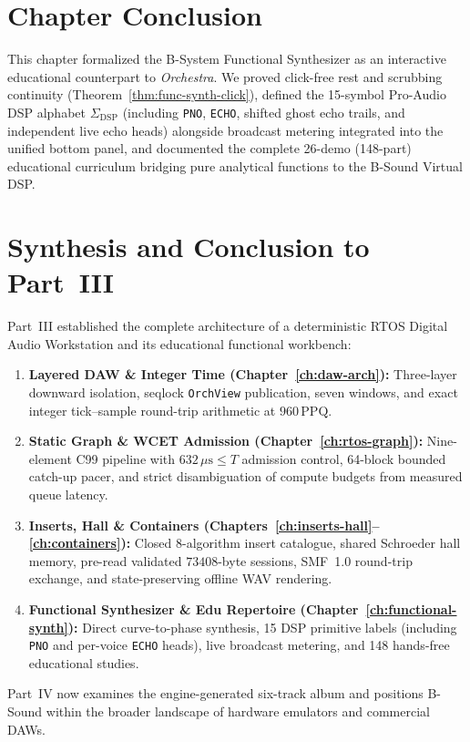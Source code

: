 \section{Chapter Conclusion}

This chapter formalized the B-System Functional Synthesizer as an interactive educational counterpart to \emph{Orchestra}. We proved click-free rest and scrubbing continuity (Theorem~\ref{thm:func-synth-click}), defined the 15-symbol Pro-Audio DSP alphabet $\Sigma_{\mathrm{DSP}}$ (including \texttt{PNO}, \texttt{ECHO}, shifted ghost echo trails, and independent live echo heads) alongside broadcast metering integrated into the unified bottom panel, and documented the complete 26-demo (148-part) educational curriculum bridging pure analytical functions to the B-Sound Virtual DSP.

\section*{Synthesis and Conclusion to Part~III}

Part~III established the complete architecture of a deterministic RTOS Digital Audio Workstation and its educational functional workbench:
\begin{enumerate}[leftmargin=1.5em]
  \item \textbf{Layered DAW \& Integer Time (Chapter~\ref{ch:daw-arch}):} Three-layer downward isolation, seqlock \texttt{OrchView} publication, seven windows, and exact integer tick--sample round-trip arithmetic at $960\,\mathrm{PPQ}$.
  \item \textbf{Static Graph \& WCET Admission (Chapter~\ref{ch:rtos-graph}):} Nine-element C99 pipeline with $632\,\mu\text{s} \le T$ admission control, 64-block bounded catch-up pacer, and strict disambiguation of compute budgets from measured queue latency.
  \item \textbf{Inserts, Hall \& Containers (Chapters~\ref{ch:inserts-hall}--\ref{ch:containers}):} Closed 8-algorithm insert catalogue, shared Schroeder hall memory, pre-read validated $73408$-byte sessions, SMF~1.0 round-trip exchange, and state-preserving offline WAV rendering.
  \item \textbf{Functional Synthesizer \& Edu Repertoire (Chapter~\ref{ch:functional-synth}):} Direct curve-to-phase synthesis, 15 DSP primitive labels (including \texttt{PNO} and per-voice \texttt{ECHO} heads), live broadcast metering, and 148 hands-free educational studies.
\end{enumerate}
Part~IV now examines the engine-generated six-track album and positions B-Sound within the broader landscape of hardware emulators and commercial DAWs.
